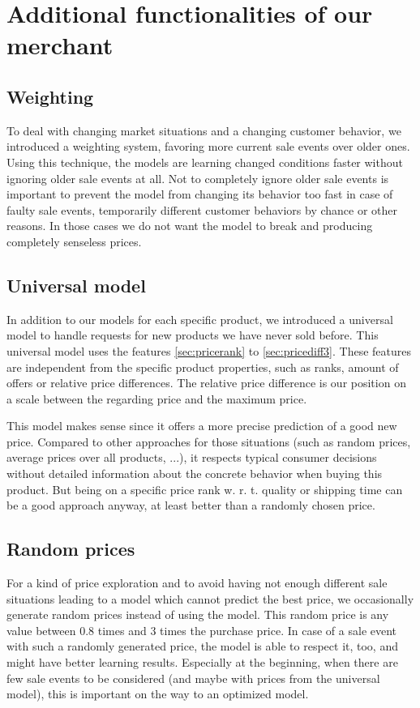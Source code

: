 \section{Additional functionalities of our merchant}
\label{sec:add_func}
\subsection{Weighting}
	To deal with changing market situations and a changing customer behavior, we introduced a weighting system, favoring more current sale events over older ones. Using this technique, the models are learning changed conditions faster without ignoring older sale events at all. Not to completely ignore older sale events is important to prevent the model from changing its behavior too fast in case of faulty sale events, temporarily different customer behaviors by chance or other reasons. In those cases we do not want the model to break and producing completely senseless prices.

\subsection{Universal model}
	\label{sec:universal_model}
	In addition to our models for each specific product, we introduced a universal model to handle requests for new products we have never sold before. This universal model uses the features \ref{sec:pricerank} to \ref{sec:pricediff3}. These features are independent from the specific product properties, such as ranks, amount of offers or relative price differences. The relative price difference is our position on a scale between the regarding price and the maximum price.

	This model makes sense since it offers a more precise prediction of a good new price. Compared to other approaches for those situations (such as random prices, average prices over all products, ...), it respects typical consumer decisions without detailed information about the concrete behavior when buying this product. But being on a specific price rank w. r. t. quality or shipping time can be a good approach anyway, at least better than a randomly chosen price.

\subsection{Random prices}
	\label{sec:random_prices}
	For a kind of price exploration and to avoid having not enough different sale situations leading to a model which cannot predict the best price, we occasionally generate random prices instead of using the model. This random price is any value between 0.8 times and 3 times the purchase price. In case of a sale event with such a randomly generated price, the model is able to respect it, too, and might have better learning results. Especially at the beginning, when there are few sale events to be considered (and maybe with prices from the universal model), this is important on the way to an optimized model.
